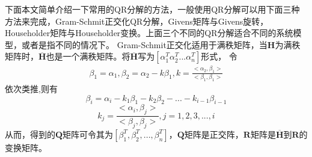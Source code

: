\documentclass[bachelor,nocolorlinks, printoneside]{seuthesis} %
\begin{document}
\begin{Main}
下面本文简单介绍一下常用的QR分解的方法，一般使用QR分解可以用下面三种方法来完成，Gram-Schmit正交化QR分解，Givens矩阵与Givens旋转，Householder矩阵与Householder变换。上面三个不同的QR分解适合不同的系统模型，或者是指不同的情况下。
Gram-Schmit正交化适用于满秩矩阵，当$\mathbf{H}$为满秩矩阵时，$\overline{\mathbf{H}}$也是一个满秩矩阵。将$\overline{\mathbf{H}}$写为$[\alpha_1^T \alpha_2^T ... \alpha_n^T]$形式，
令
\begin{eqnarray}\label{key}
\beta_1 = \alpha_1 , \beta_2 = \alpha_2 - k\beta_1 , k = \frac{<\alpha_2,\beta_1>}{<\beta_1,\beta_1>} \nonumber
\end{eqnarray}
依次类推,则有
\begin{equation}\label{key}
\beta_i = \alpha_i - k_1\beta_1 -k_2\beta_2 - ... - k_{i-1}\beta_{i-1} \nonumber
\end{equation}
\begin{equation}\label{key}
k_j = \frac{<\alpha_i,\beta_j>}{<\beta_j,\beta_j>}, j= 1,2,3,...,i \nonumber
\end{equation}
从而，得到的$\mathbf{Q}$矩阵可令其为$[\beta_1^T,\beta_2^T,...,\beta_n^T]$，$\mathbf{Q}$矩阵是正交阵，$\mathbf{R}$矩阵是$\overline{\mathbf{H}}$到$\mathbf{R}$的变换矩阵。\\


\end{Main}
\end{document}

